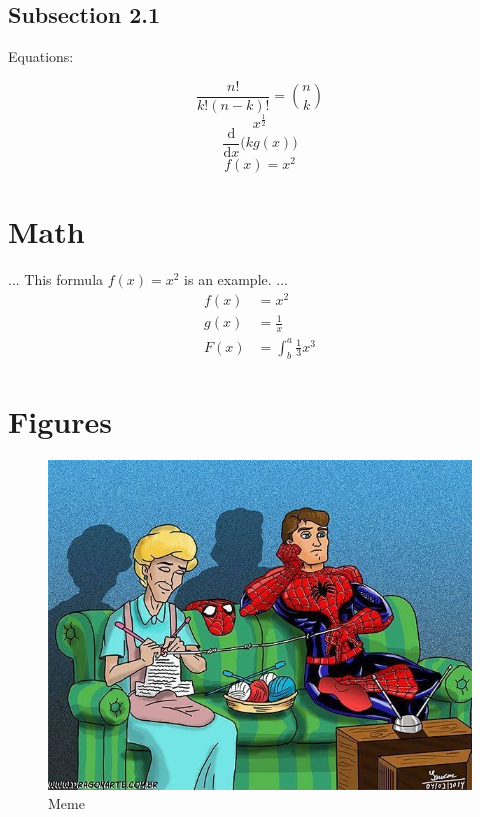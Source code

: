 \documentclass{article}
\begin{document}
    \subsection{Subsection 2.1}
    Equations:
    
        \begin{equation}
            \frac{n!}{k!(n-k)!} = \binom{n}{k}  
        \end{equation}
        \begin{equation}
            x^\frac{1}{2}  
        \end{equation}
        \begin{equation}
            \frac{\mathrm d}{\mathrm d x} \big( k g(x) \big)
        \end{equation}
        \begin{equation*}
            f(x) = x^2
        \end{equation*}
    
    \section{Math}
    ...
    This formula $f(x) = x^2$ is an example.
    ...
    \begin{align*}
        f(x) &= x^2\\
        g(x) &= \frac{1}{x}\\
        F(x) &= \int^a_b \frac{1}{3}x^3
      \end{align*}
    
    \section{Figures}
    \begin{figure}
        \includegraphics[width=\linewidth]{pic.png}
        \caption{Meme}
        \label{fig:meme}
      \end{figure}

    
\end{document}
